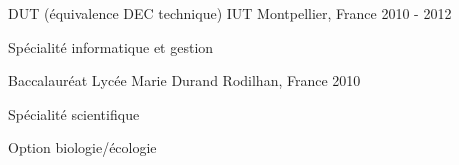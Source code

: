 \begin{cventries}
  \cventry
    {DUT (équivalence DEC technique)} %
    {IUT} %
    {Montpellier, France} %
    {2010 - 2012} %
    {
      \begin{cvitems} %
        \item {Spécialité informatique et gestion}
      \end{cvitems}
    }

  \cventry
    {Baccalauréat} %
    {Lycée Marie Durand} %
    {Rodilhan, France} %
    {2010} %
    {
      \begin{cvitems} %
        \item {Spécialité scientifique}
        \item {Option biologie/écologie}
      \end{cvitems}
    }

\end{cventries}
